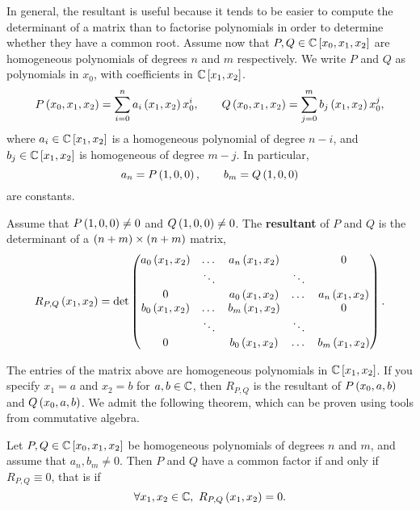 \pagebreak


In general, the resultant is useful because it tends to be easier to compute the determinant of a matrix than to factorise polynomials in order to determine whether they have a common root. Assume now that $ P, Q \in \mathbb{C}\left[ x_0, x_1, x_2 \right] $ are homogeneous polynomials of degrees $ n $ and $ m $ respectively. We write $ P $ and $ Q $ as polynomials in $ x_0 $, with coefficients in $ \mathbb{C}\left[ x_1, x_2 \right] $.
$$ P\left( x_0, x_1, x_2 \right) = \sum_{i = 0}^n a_i\left( x_1, x_2 \right)x_0^i, \qquad Q\left( x_0, x_1, x_2 \right) = \sum_{j = 0}^m b_j\left( x_1, x_2 \right)x_0^j, $$
where $ a_i \in \mathbb{C}\left[ x_1, x_2 \right] $ is a homogeneous polynomial of degree $ n - i $, and $ b_j \in \mathbb{C}\left[ x_1, x_2 \right] $ is homogeneous of degree $ m - j $. In particular,
$$ a_n = P\left( 1, 0, 0 \right), \qquad b_m = Q\left( 1, 0, 0 \right) $$
are constants.

\begin{definition}
\label{def:9.5}
Assume that $ P\left( 1, 0, 0 \right) \ne 0 $ and $ Q\left( 1, 0, 0 \right) \ne 0 $. The \textbf{resultant} of $ P $ and $ Q $ is the determinant of a $ \left( n + m \right) \times \left( n + m \right) $ matrix,
$$ R_{P, Q}\left( x_1, x_2 \right) = \det
\begin{pmatrix}
a_0\left( x_1, x_2 \right) & \dots & a_n\left( x_1, x_2 \right) & & 0 \\
& \ddots & & \ddots & \\
0 & & a_0\left( x_1, x_2 \right) & \dots & a_n\left( x_1, x_2 \right) \\
b_0\left( x_1, x_2 \right) & \dots & b_m\left( x_1, x_2 \right) & & 0 \\
& \ddots & & \ddots & \\
0 & & b_0\left( x_1, x_2 \right) & \dots & b_m\left( x_1, x_2 \right)
\end{pmatrix}.
$$
\end{definition}

The entries of the matrix above are homogeneous polynomials in $ \mathbb{C}\left[ x_1, x_2 \right] $. If you specify $ x_1 = a $ and $ x_2 = b $ for $ a, b \in \mathbb{C} $, then $ R_{P, Q} $ is the resultant of $ P\left( x_0, a, b \right) $ and $ Q\left( x_0, a, b \right) $. We admit the following theorem, which can be proven using tools from commutative algebra.

\begin{theorem}
\label{thm:9.6}
Let $ P, Q \in \mathbb{C}\left[ x_0, x_1, x_2 \right] $ be homogeneous polynomials of degrees $ n $ and $ m $, and assume that $ a_n, b_m \ne 0 $. Then $ P $ and $ Q $ have a common factor if and only if $ R_{P, Q} \equiv 0 $, that is if
$$ \forall x_1, x_2 \in \mathbb{C}, \ R_{P, Q}\left( x_1, x_2 \right) = 0. $$
\end{theorem}


